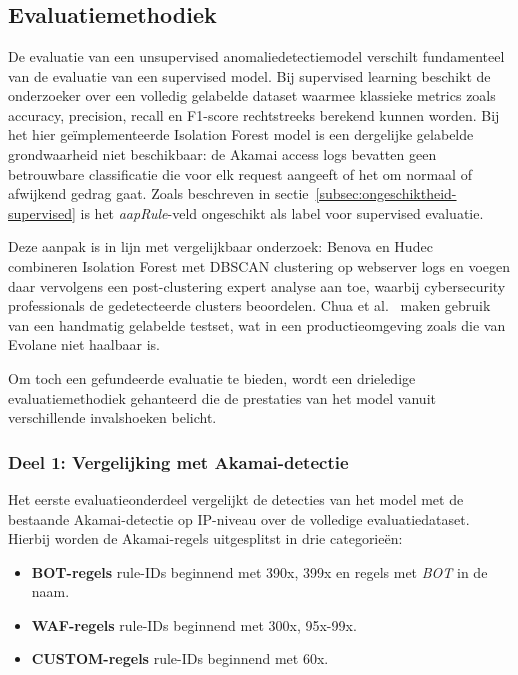 \chapter{}%
\label{ch:evaluatie}
 
\section{Evaluatiemethodiek}
\label{sec:evaluatiemethodiek}
 
De evaluatie van een unsupervised anomaliedetectiemodel verschilt fundamenteel van de evaluatie van een supervised model. Bij supervised learning beschikt de onderzoeker over een volledig gelabelde dataset waarmee klassieke metrics zoals accuracy, precision, recall en F1-score rechtstreeks berekend kunnen worden. Bij het hier geïmplementeerde Isolation Forest model is een dergelijke gelabelde grondwaarheid niet beschikbaar: de Akamai access logs bevatten geen betrouwbare classificatie die voor elk request aangeeft of het om normaal of afwijkend gedrag gaat. Zoals beschreven in sectie~\ref{subsec:ongeschiktheid-supervised} is het \textit{aapRule}-veld ongeschikt als label voor supervised evaluatie.
 
Deze aanpak is in lijn met vergelijkbaar onderzoek: Benova en Hudec~\autocite{Benova2024} combineren Isolation Forest met DBSCAN clustering op webserver logs en voegen daar vervolgens een post-clustering expert analyse aan toe, waarbij cybersecurity professionals de gedetecteerde clusters beoordelen. Chua et al.~\autocite{Chua2024} maken gebruik van een handmatig gelabelde testset, wat in een productieomgeving zoals die van Evolane niet haalbaar is.
 
Om toch een gefundeerde evaluatie te bieden, wordt een drieledige evaluatiemethodiek gehanteerd die de prestaties van het model vanuit verschillende invalshoeken belicht.
 
\subsection{Deel 1: Vergelijking met Akamai-detectie}
\label{subsec:eval-vergelijking-akamai}
 
Het eerste evaluatieonderdeel vergelijkt de detecties van het model met de bestaande Akamai-detectie op IP-niveau over de volledige evaluatiedataset. Hierbij worden de Akamai-regels uitgesplitst in drie categorieën:
 
\begin{itemize}
    \item \textbf{BOT-regels} rule-IDs beginnend met 390x, 399x en regels met \textit{BOT} in de naam.
    \item \textbf{WAF-regels} rule-IDs beginnend met 300x, 95x-99x.
    \item \textbf{CUSTOM-regels} rule-IDs beginnend met 60x.
\end{itemize}
 
